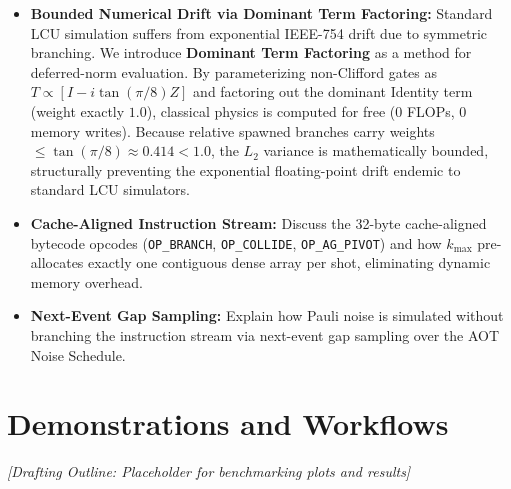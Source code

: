 \documentclass[aps,prx,reprint,superscriptaddress,nofootinbib]{revtex4-2}
\theoremstyle{definition}
\begin{document}
\begin{itemize}[leftmargin=*]
    \item \textbf{Bounded Numerical Drift via Dominant Term Factoring:}
    Standard LCU simulation suffers from exponential IEEE-754 drift due to symmetric branching. We introduce \textbf{Dominant Term Factoring} as a method for deferred-norm evaluation. By parameterizing non-Clifford gates as $T \propto [I - i\tan(\pi/8)Z]$ and factoring out the dominant Identity term (weight exactly $1.0$), classical physics is computed for free (0 FLOPs, 0 memory writes). Because relative spawned branches carry weights $\le \tan(\pi/8) \approx 0.414 < 1.0$, the $L_2$ variance is mathematically bounded, structurally preventing the exponential floating-point drift endemic to standard LCU simulators.
    \item \textbf{Cache-Aligned Instruction Stream:} Discuss the 32-byte cache-aligned bytecode opcodes (\texttt{OP\_BRANCH}, \texttt{OP\_COLLIDE}, \texttt{OP\_AG\_PIVOT}) and how $k_{\max}$ pre-allocates exactly one contiguous dense array per shot, eliminating dynamic memory overhead.
    \item \textbf{Next-Event Gap Sampling:} Explain how Pauli noise is simulated without branching the instruction stream via next-event gap sampling over the AOT Noise Schedule.
\end{itemize}

\section{Demonstrations and Workflows}
\label{sec:demos}

\textit{[Drafting Outline: Placeholder for benchmarking plots and results]}
\end{document}
